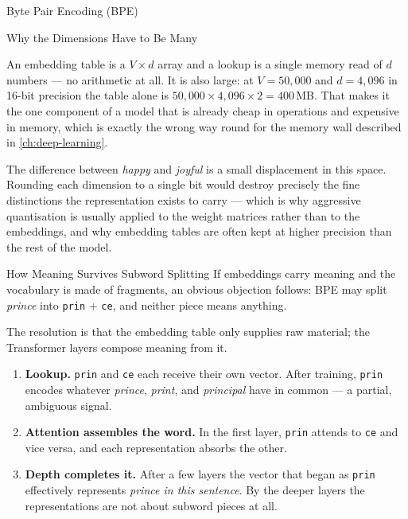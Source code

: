 \begin{v3topic}{Byte Pair Encoding (BPE)}
\begin{v3topic}{Why the Dimensions Have to Be Many}
\begin{engineernote}
An embedding table is a $V\times d$ array and a lookup is a single memory read
of $d$ numbers --- no arithmetic at all. It is also large: at $V = 50{,}000$ and
$d = 4{,}096$ in 16-bit precision the table alone is
$50{,}000 \times 4{,}096 \times 2 = 400$\,MB. That makes it the one component
of a model that is already cheap in operations and expensive in memory, which
is exactly the wrong way round for the memory wall described in
\cref{ch:deep-learning}.
\end{engineernote}

\begin{cautionbox}
The difference between \emph{happy} and \emph{joyful} is a small displacement
in this space. Rounding each dimension to a single bit would destroy precisely
the fine distinctions the representation exists to carry --- which is why
aggressive quantisation is usually applied to the weight matrices rather than
to the embeddings, and why embedding tables are often kept at higher precision
than the rest of the model.
\end{cautionbox}
\end{v3topic}

\begin{v3topic}{How Meaning Survives Subword Splitting}
If embeddings carry meaning and the vocabulary is made of fragments, an obvious
objection follows: BPE may split \emph{prince} into \texttt{prin} + \texttt{ce},
and neither piece means anything.

The resolution is that the embedding table only supplies raw material; the
Transformer layers compose meaning from it.

\begin{enumerate}
  \item \textbf{Lookup.} \texttt{prin} and \texttt{ce} each receive their own
    vector. After training, \texttt{prin} encodes whatever
    \emph{prince}, \emph{print}, and \emph{principal} have in common --- a
    partial, ambiguous signal.
  \item \textbf{Attention assembles the word.} In the first layer, \texttt{prin}
    attends to \texttt{ce} and vice versa, and each representation absorbs the
    other.
  \item \textbf{Depth completes it.} After a few layers the vector that began
    as \texttt{prin} effectively represents \emph{prince in this sentence}. By
    the deeper layers the representations are not about subword pieces at all.
\end{enumerate}


\end{v3topic}
\end{v3topic}
